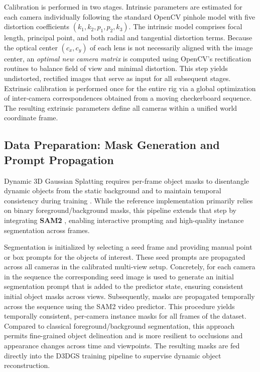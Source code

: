 Calibration is performed in two stages. Intrinsic parameters are estimated for each camera individually following the standard OpenCV pinhole model with five distortion coefficients \((k_1, k_2, p_1, p_2, k_3)\). The intrinsic model comprises focal length, principal point, and both radial and tangential distortion terms.
Because the optical center \((c_x, c_y)\) of each lens is not necessarily aligned with the image center, an \emph{optimal new camera matrix} is computed using OpenCV’s rectification routines to balance field of view and minimal distortion. This step yields undistorted, rectified images that serve as input for all subsequent stages.
Extrinsic calibration is performed once for the entire rig via a global optimization of inter-camera correspondences obtained from a moving checkerboard sequence. 
The resulting extrinsic parameters define all cameras within a unified world coordinate frame.  

\subsection{Data Preparation: Mask Generation and Prompt Propagation}
\label{sec:maskgen}

Dynamic 3D Gaussian Splatting requires per-frame object masks to disentangle dynamic objects from the static background and to maintain temporal consistency during training \cite{luiten2024dynamic}. While the reference implementation primarily relies on binary foreground/background masks, this pipeline extends that step by integrating \textbf{SAM2} \cite{ravi2024sam2}, enabling interactive prompting and high-quality instance segmentation across frames.

Segmentation is initialized by selecting a seed frame and providing manual point or box prompts for the objects of interest. These seed prompts are propagated across all cameras in the calibrated multi-view setup. Concretely, for each camera in the sequence the corresponding seed image is used to generate an initial segmentation prompt that is added to the predictor state, ensuring consistent initial object masks across views. Subsequently, masks are propagated temporally across the sequence using the SAM2 video predictor. This procedure yields temporally consistent, per-camera instance masks for all frames of the dataset. Compared to classical foreground/background segmentation, this approach permits fine-grained object delineation and is more resilient to occlusions and appearance changes across time and viewpoints. The resulting masks are fed directly into the D3DGS training pipeline to supervise dynamic object reconstruction.

